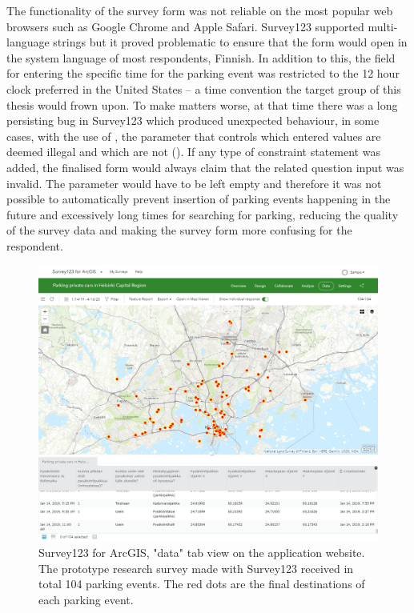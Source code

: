 The functionality of the survey form was not reliable on the most popular web browsers such as Google Chrome and Apple Safari. Survey123 supported multi-language strings but it proved problematic to ensure that the form would open in the system language of most respondents, Finnish. In addition to this, the field for entering the specific time for the parking event was restricted to the 12 hour clock preferred in the United States -- a time convention the target group of this thesis would frown upon. To make matters worse, at that time there was a long persisting bug in Survey123 which produced unexpected behaviour, in some cases, with the use of , the parameter that controls which entered values are deemed illegal and which are not (\cite{GeoNet-TheEsriCommunity2018}). If any type of constraint statement was added, the finalised form would always claim that the related question input was invalid. The parameter would have to be left empty and therefore it was not possible to automatically prevent insertion of parking events happening in the future and excessively long times for searching for parking, reducing the quality of the survey data and making the survey form more confusing for the respondent.

\begin{figure}[H]%
    \includegraphics[width=\textwidth]{images/survey123_dataview.png}
    \caption[The Survey123 web application dashboard]{Survey123 for ArcGIS, "data" tab view on the application website. The prototype research survey made with Survey123 received in total 104 parking events. The red dots are the final destinations of each parking event.}%
    \label{fig:survey123_dataview}%
\end{figure}

